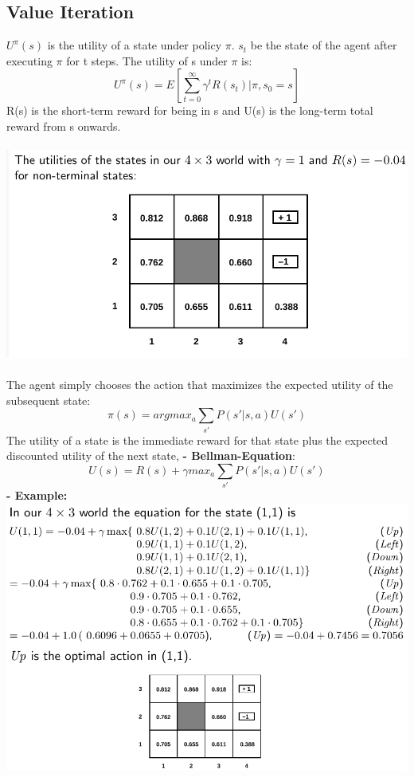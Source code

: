 \documentclass{article}
\begin{document}
\subsection{Value Iteration}
$U^\pi(s)$ is the utility of a state under policy $\pi$. $s_t$ be the state of the agent after executing $\pi$ for t steps. The utility of s under $\pi$ is:\\
\begin{equation}
U^\pi(s) = E[\sum_{t=0}^\infty \gamma^tR(s_t)|\pi, s_0=s]
\end{equation}
R(s) is the short-term reward for being in s and U(s) is the long-term total reward from s onwards.\\\\
\includegraphics[scale=0.5]{79.png}\\\\
The agent simply chooses the action that maximizes the expected utility of the subsequent state:
\begin{equation}
\pi(s) = argmax_a\sum_{s'}P(s'|s,a)U(s')
\end{equation}
The utility of a state is the immediate reward for that state plus the expected discounted utility of the next state, \textbf{- Bellman-Equation}:
\begin{equation}
U(s) = R(s) + \gamma max_a \sum_{s'}P(s'|s,a)U(s')
\end{equation}
\textbf{- Example:}\\
\includegraphics[scale=0.5]{80.png}\\\\
\end{document}
